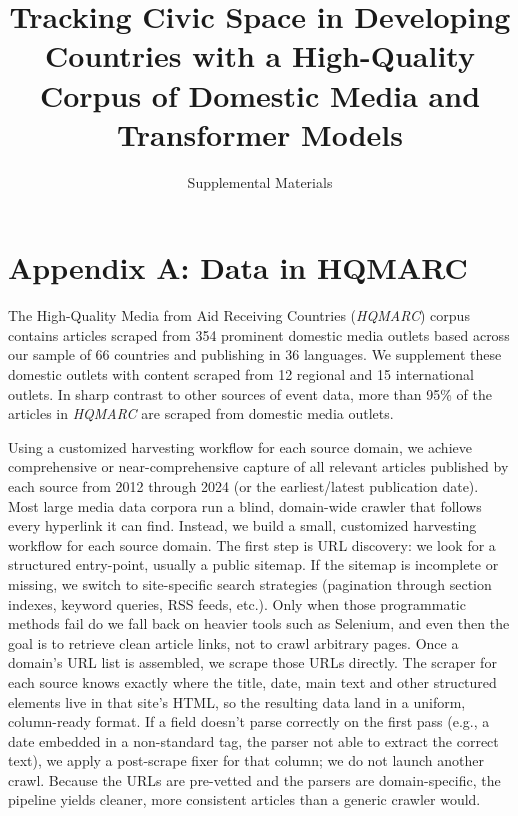 \documentclass[
  letterpaper,
  DIV=11,
  numbers=noendperiod]{scrartcl}
\title{Tracking Civic Space in Developing Countries with a High-Quality
Corpus of Domestic Media and Transformer Models}
\subtitle{Supplemental Materials}
\author{}
\date{}
\renewcommand*\contentsname{Table of contents}
\newcommand\contentsname{Table of contents}
\begin{document}
\maketitle

\renewcommand*\contentsname{Table of contents}
{
\hypersetup{linkcolor=}
\setcounter{tocdepth}{3}
\tableofcontents
}

\newpage{}

\section{Appendix A: Data in HQMARC}\label{appendix-a-data-in-hqmarc}

The High-Quality Media from Aid Receiving Countries (\emph{HQMARC})
corpus contains articles scraped from 354 prominent domestic media
outlets based across our sample of 66 countries and publishing in 36
languages. We supplement these domestic outlets with content scraped
from 12 regional and 15 international outlets. In sharp contrast to
other sources of event data, more than 95\% of the articles in
\emph{HQMARC} are scraped from domestic media outlets.

Using a customized harvesting workflow for each source domain, we
achieve comprehensive or near-comprehensive capture of all relevant
articles published by each source from 2012 through 2024 (or the
earliest/latest publication date). Most large media data corpora run a
blind, domain-wide crawler that follows every hyperlink it can find.
Instead, we build a small, customized harvesting workflow for each
source domain. The first step is URL discovery: we look for a structured
entry-point, usually a public sitemap. If the sitemap is incomplete or
missing, we switch to site-specific search strategies (pagination
through section indexes, keyword queries, RSS feeds, etc.). Only when
those programmatic methods fail do we fall back on heavier tools such as
Selenium, and even then the goal is to retrieve clean article links, not
to crawl arbitrary pages. Once a domain's URL list is assembled, we
scrape those URLs directly. The scraper for each source knows exactly
where the title, date, main text and other structured elements live in
that site's HTML, so the resulting data land in a uniform, column-ready
format. If a field doesn't parse correctly on the first pass (e.g., a
date embedded in a non-standard tag, the parser not able to extract the
correct text), we apply a post-scrape fixer for that column; we do not
launch another crawl. Because the URLs are pre-vetted and the parsers
are domain-specific, the pipeline yields cleaner, more consistent
articles than a generic crawler would.
\end{document}
